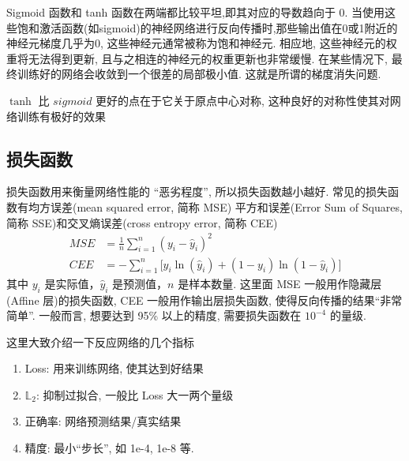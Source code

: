 \documentclass[lang=cn,a4paper,newtx]{elegantpaper}
\begin{document}
Sigmoid 函数和 tanh 函数在两端都比较平坦,即其对应的导数趋向于 0. 当使用这些饱和激活函数(如sigmoid)的神经网络进行反向传播时,那些输出值在0或1附近的神经元梯度几乎为0, 这些神经元通常被称为饱和神经元. 相应地, 这些神经元的权重将无法得到更新, 且与之相连的神经元的权重更新也非常缓慢. 在某些情况下, 最终训练好的网络会收敛到一个很差的局部极小值. 这就是所谓的梯度消失问题.
\begin{remark}
    $ \tanh $ 比 $ sigmoid $ 更好的点在于它关于原点中心对称, 这种良好的对称性使其对网络训练有极好的效果
\end{remark}



\subsection{损失函数}
损失函数用来衡量网络性能的 ``恶劣程度'', 所以损失函数越小越好. 常见的损失函数有均方误差(mean squared error, 简称 MSE) 平方和误差(Error Sum of Squares, 简称 SSE)和交叉熵误差(cross entropy error, 简称 CEE)
\begin{equation}
    \begin{aligned}
        MSE &= \frac{1}{n} \sum_{i=1}^{n} (y_i - \hat{y}_i)^2 \\
        CEE &= - \sum_{i=1}^{n} \big[ y_i \ln(\hat{y}_i) + (1 - y_i) \ln(1 - \hat{y}_i) \big]
    \end{aligned}
\end{equation}
其中 $ y_i $ 是实际值，$ \hat{y}_i $ 是预测值，$ n $ 是样本数量. 
这里面 MSE 一般用作隐藏层(Affine 层)的损失函数, CEE 一般用作输出层损失函数, 使得反向传播的结果``非常简单''. 
一般而言, 想要达到 95\% 以上的精度, 需要损失函数在 $ 10^{-4} $ 的量级. 

\begin{remark}
    这里大致介绍一下反应网络的几个指标 
    \begin{enumerate}
        \item Loss: 用来训练网络, 使其达到好结果
        \item $ \mathbb{L}_{2} $: 抑制过拟合, 一般比 Loss 大一两个量级
        \item 正确率: 网络预测结果/真实结果
        \item 精度: 最小``步长'', 如 1e-4, 1e-8 等.
    \end{enumerate}
\end{remark}
\end{document}
